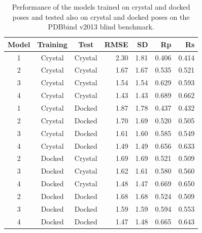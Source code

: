 \begin{table}
\caption{Performance of the models trained on crystal and docked poses and tested also on crystal and docked poses on the PDBbind v2013 blind benchmark.}
\label{rfscore4:set-2-pdbbind-2012}
\begin{tabular}{cccrrrr}
\hline
Model & Training & Test & RMSE & SD & Rp & Rs\\
\hline
1 & Crystal & Crystal & 2.30 & 1.81 & 0.406 & 0.414\\
2 & Crystal & Crystal & 1.67 & 1.67 & 0.535 & 0.521\\
3 & Crystal & Crystal & 1.54 & 1.54 & 0.629 & 0.593\\
4 & Crystal & Crystal & 1.43 & 1.43 & 0.689 & 0.662\\
\hline
1 & Crystal & Docked  & 1.87 & 1.78 & 0.437 & 0.432\\
2 & Crystal & Docked  & 1.70 & 1.69 & 0.520 & 0.505\\
3 & Crystal & Docked  & 1.61 & 1.60 & 0.585 & 0.549\\
4 & Crystal & Docked  & 1.49 & 1.49 & 0.656 & 0.633\\
\hline
2 & Docked  & Crystal & 1.69 & 1.69 & 0.521 & 0.509\\
3 & Docked  & Crystal & 1.62 & 1.61 & 0.580 & 0.560\\
4 & Docked  & Crystal & 1.48 & 1.47 & 0.669 & 0.650\\
\hline
2 & Docked  & Docked  & 1.68 & 1.68 & 0.524 & 0.509\\
3 & Docked  & Docked  & 1.59 & 1.59 & 0.594 & 0.553\\
4 & Docked  & Docked  & 1.47 & 1.48 & 0.665 & 0.643\\
\hline
\end{tabular}
\end{table}

